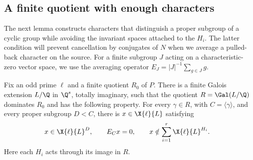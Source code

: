 \subsection{A finite quotient with enough characters}

The next lemma constructs characters that distinguish a proper
subgroup of a cyclic group while avoiding the invariant spaces attached
to the $H_i$. The latter condition will prevent cancellation by
conjugates of $N$ when we average a pulled-back character on the source.
For a finite subgroup $J$ acting on a characteristic-zero vector space,
we use the averaging operator $E_J=|J|^{-1}\sum_{g\in J}g$.

\begin{lemma}\label{lem:quotient-amplification}
Fix an odd prime $\ell$ and a finite quotient $R_0$ of $P$. There is
a finite Galois extension $L/\Q$ in $\Q^s$, totally imaginary, such that
the quotient $R=\Gal(L/\Q)$ dominates $R_0$ and has the following
property. For every $\gamma\in R$, with $C=\langle\gamma\rangle$, and
every proper subgroup $D<C$, there is $x\in\X{\ell}{L}$ satisfying
\begin{equation}\label{eq:separating-character}
 x\in\X{\ell}{L}^{D},\qquad E_Cx=0,\qquad
 x\notin\sum_{i=1}^r\X{\ell}{L}^{H_i}.
\end{equation}
Here each $H_i$ acts through its image in $R$.
\end{lemma}

